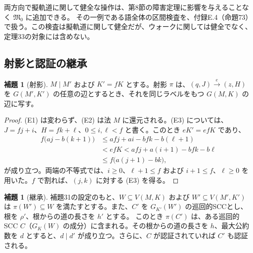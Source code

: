 \documentclass[11pt,reqno]{amsart}
\theoremstyle{definition}
\newtheorem{lemma}[theorem]{補題}
\theoremstyle{definition}
\theoremstyle{remark}
\begin{document}
両方向で擬軌道に関して健全な操作は、第8節の障害定理に影響を与えることなく \(\mathfrak M_0\) に追加できる。
その一例である語全体の区間検査を、付録E.4（命題73）で扱う。この検査は擬軌道に関して健全だが、ウォークに関しては健全でなく、定理33の対象には含めない。

\subsection{射影と認証の継承}\label{sec:7.3}

\begin{samepage}
\begin{lemma}[射影]\leavevmode\label{thm:31}
\(M\mid M'\) および \(K'=fK\) とする。射影 \(\pi\) は、\((q,J)\xrightarrow{e}(z,H)\) を \(G(M',K')\) の任意の辺とするとき、それを同じラベルをもつ \(G(M,K)\) の辺に写す。
\label{thm-end:31}
\end{lemma}
\end{samepage}

\begin{proof}\leavevmode\label{proof:31}
(E1) は変わらず、(E2) は法 \(M\) に還元される。(E3) については、\(J=fj+i\)、\(H=fk+\ell\)、\(0\le i,\ell<f\) と書く。このとき
\(eK'=efK\)
であり、
\[
\begin{aligned}
f\bigl(aj-b(k+1)\bigr)&\le afj+ai-bfk-b(\ell+1)\\
&<efK<afj+a(i+1)-bfk-b\ell\\
&\le f\bigl(a(j+1)-bk\bigr),
\end{aligned}
\]
が成り立つ。両端の不等式では、\(i\ge0\)、\(\ell+1\le f\) および \(i+1\le f\)、\(\ell\ge0\) を用いた。\(f\) で割れば、\((j,k)\) に対する (E3) を得る。\qedhere
\end{proof}

\begin{samepage}
\begin{lemma}[継承]\leavevmode\label{thm:32}
補題31の設定のもと、\(W\subseteq V(M,K)\) および \(W'\subseteq V(M',K')\) は \(\pi(W')\subseteq W\) を満たすとする。また、\(C'\) を \(G_{K'}(W')\) の巡回的SCCとし、根を \(\rho'\)、根からの道の長さを \(h'\) とする。
このとき \(\pi(C')\) は、ある巡回的SCC \(C\)（\(G_K(W)\) の成分）に含まれる。その根からの道の長さを \(h\)、最大公約数を \(d\) とすると、\(d\mid d'\) が成り立つ。さらに、\(C\) が認証されていれば \(C'\) も認証される。
\label{thm-end:32}
\end{lemma}
\end{samepage}
\end{document}

